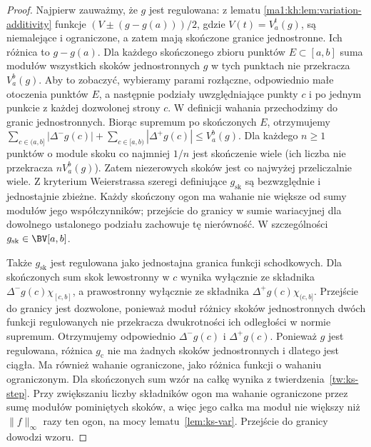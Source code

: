 \begin{proof}
Najpierw zauważmy, że $g$ jest regulowana: z lematu \ref{ma1:kh:lem:variation-additivity} funkcje $(V\pm(g-g(a)))/2$, gdzie $V(t)=V_a^t(g)$, są niemalejące i ograniczone, a zatem mają skończone granice jednostronne. Ich różnica to $g-g(a)$. Dla każdego skończonego zbioru punktów $E\subset[a,b]$ suma modułów wszystkich skoków jednostronnych $g$ w tych punktach nie przekracza $V_a^b(g)$. Aby to zobaczyć, wybieramy parami rozłączne, odpowiednio małe otoczenia punktów $E$, a następnie podziały uwzględniające punkty $c$ i po jednym punkcie z każdej dozwolonej strony $c$. W definicji wahania przechodzimy do granic jednostronnych. Biorąc supremum po skończonych $E$, otrzymujemy
$\sum_{c\in(a,b]}|\Delta^-g(c)|+\sum_{c\in[a,b)}|\Delta^+g(c)|\le V_a^b(g)$. Dla każdego $n\ge1$ punktów o module skoku co najmniej $1/n$ jest skończenie wiele (ich liczba nie przekracza $nV_a^b(g)$). Zatem niezerowych skoków jest co najwyżej przeliczalnie wiele. Z kryterium Weierstrassa szeregi definiujące $g_{\mathrm{sk}}$ są bezwzględnie i jednostajnie zbieżne. Każdy skończony ogon ma wahanie nie większe od sumy modułów jego współczynników; przejście do granicy w sumie wariacyjnej dla dowolnego ustalonego podziału zachowuje tę nierówność. W szczególności $g_{\mathrm{sk}}\in\BV[a,b]$.

Także $g_{\mathrm{sk}}$ jest regulowana jako jednostajna granica funkcji schodkowych. Dla skończonych sum skok lewostronny w $c$ wynika wyłącznie ze składnika $\Delta^-g(c)\chi_{[c,b]}$, a prawostronny wyłącznie ze składnika $\Delta^+g(c)\chi_{(c,b]}$. Przejście do granicy jest dozwolone, ponieważ moduł różnicy skoków jednostronnych dwóch funkcji regulowanych nie przekracza dwukrotności ich odległości w normie supremum. Otrzymujemy odpowiednio $\Delta^-g(c)$ i $\Delta^+g(c)$. Ponieważ $g$ jest regulowana, różnica $g_{\mathrm c}$ nie ma żadnych skoków jednostronnych i dlatego jest ciągła. Ma również wahanie ograniczone, jako różnica funkcji o wahaniu ograniczonym. Dla skończonych sum wzór na całkę wynika z twierdzenia~\ref{tw:ks-step}. Przy zwiększaniu liczby składników ogon ma wahanie ograniczone przez sumę modułów pominiętych skoków, a więc jego całka ma moduł nie większy niż $\|f\|_\infty$ razy ten ogon, na mocy lematu~\ref{lem:ks-var}. Przejście do granicy dowodzi wzoru.
\end{proof}

